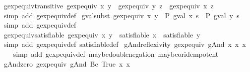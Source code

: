 \begin{isabellebody}
\ gexp{\isacharunderscore}equiv{\isacharunderscore}transitive{\isacharcolon}\ {\isachardoublequoteopen}gexp{\isacharunderscore}equiv\ x\ y\ {\isasymand}\ gexp{\isacharunderscore}equiv\ y\ z\ {\isasymLongrightarrow}\ gexp{\isacharunderscore}equiv\ x\ z{\isachardoublequoteclose}\isanewline
%
\isadelimproof
\ \ %
\endisadelimproof
%
\isatagproof
{}\isamarkupfalse%
\ {\isacharparenleft}simp\ add{\isacharcolon}\ gexp{\isacharunderscore}equiv{\isacharunderscore}def{\isacharparenright}%
\endisatagproof
{\isafoldproof}%
%
\isadelimproof
\isanewline
%
\endisadelimproof
\isanewline
{}\isamarkupfalse%
\ gval{\isacharunderscore}subst{\isacharcolon}\ {\isachardoublequoteopen}gexp{\isacharunderscore}equiv\ x\ y\ {\isasymLongrightarrow}\ P\ {\isacharparenleft}gval\ x\ s{\isacharparenright}\ {\isasymLongrightarrow}\ P\ {\isacharparenleft}gval\ y\ s{\isacharparenright}{\isachardoublequoteclose}\isanewline
%
\isadelimproof
\ \ %
\endisadelimproof
%
\isatagproof
{}\isamarkupfalse%
\ {\isacharparenleft}simp\ add{\isacharcolon}\ gexp{\isacharunderscore}equiv{\isacharunderscore}def{\isacharparenright}%
\endisatagproof
{\isafoldproof}%
%
\isadelimproof
\isanewline
%
\endisadelimproof
\isanewline
{}\isamarkupfalse%
\ gexp{\isacharunderscore}equiv{\isacharunderscore}satisfiable{\isacharcolon}\ {\isachardoublequoteopen}gexp{\isacharunderscore}equiv\ x\ y\ {\isasymLongrightarrow}\ satisfiable\ x\ {\isacharequal}\ satisfiable\ y{\isachardoublequoteclose}\isanewline
%
\isadelimproof
\ \ %
\endisadelimproof
%
\isatagproof
{}\isamarkupfalse%
\ {\isacharparenleft}simp\ add{\isacharcolon}\ gexp{\isacharunderscore}equiv{\isacharunderscore}def\ satisfiable{\isacharunderscore}def{\isacharparenright}%
\endisatagproof
{\isafoldproof}%
%
\isadelimproof
\isanewline
%
\endisadelimproof
\isanewline
{}\isamarkupfalse%
\ gAnd{\isacharunderscore}reflexivity{\isacharcolon}\ {\isachardoublequoteopen}gexp{\isacharunderscore}equiv\ {\isacharparenleft}gAnd\ x\ x{\isacharparenright}\ x{\isachardoublequoteclose}\isanewline
%
\isadelimproof
\ \ %
\endisadelimproof
%
\isatagproof
{}\isamarkupfalse%
\ {\isacharparenleft}simp\ add{\isacharcolon}\ gexp{\isacharunderscore}equiv{\isacharunderscore}def\ maybe{\isacharunderscore}double{\isacharunderscore}negation\ maybe{\isacharunderscore}or{\isacharunderscore}idempotent{\isacharparenright}%
\endisatagproof
{\isafoldproof}%
%
\isadelimproof
\isanewline
%
\endisadelimproof
\isanewline
{}\isamarkupfalse%
\ gAnd{\isacharunderscore}zero{\isacharcolon}\ {\isachardoublequoteopen}gexp{\isacharunderscore}equiv\ {\isacharparenleft}gAnd\ {\isacharparenleft}Bc\ True{\isacharparenright}\ x{\isacharparenright}\ x{\isachardoublequoteclose}\isanewline

\end{isabellebody}
